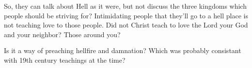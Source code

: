 So, they can talk about Hell as it were, but not discuss the three kingdoms which
people should be striving for? Intimidating people that they'll go to a hell place 
is not teaching love to those people. Did not Christ teach to love the Lord your God
and your neighbor? Those around you?

Is it a way of preaching hellfire and damnation? Which was probably consistant with
19th century teachings at the time?